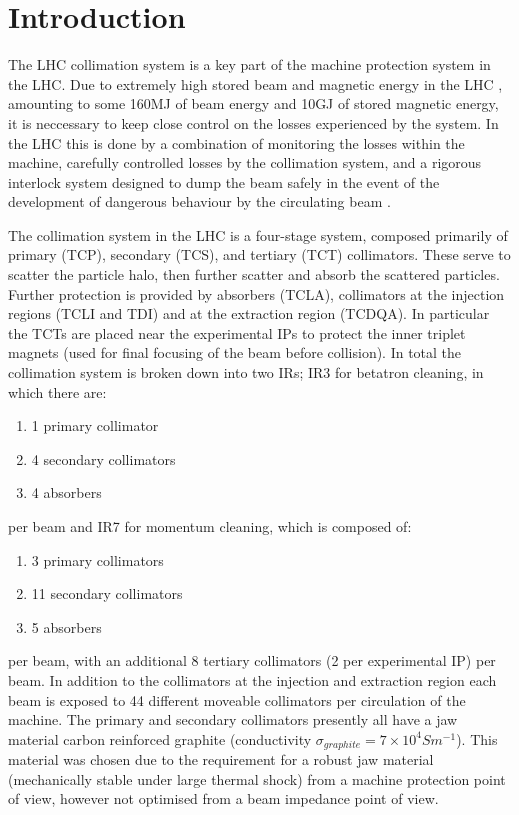 \section{Introduction}

The LHC collimation system is a key part of the machine protection system in the LHC. Due to extremely high stored beam and magnetic energy in the LHC \cite{Schmidt:LHCMP}, amounting to some 160MJ of beam energy and 10GJ of stored magnetic energy, it is neccessary to keep close control on the losses experienced by the system. In the LHC this is done by a combination of monitoring the losses within the machine, carefully controlled losses by the collimation system, and a rigorous interlock system designed to dump the beam safely in the event of the development of dangerous behaviour by the circulating beam \cite{Schmidt:LHCMP}.

The collimation system in the LHC is a four-stage system, composed primarily of primary (TCP), secondary (TCS), and tertiary (TCT) collimators. These serve to scatter the particle halo, then further scatter and absorb the scattered particles. Further protection is provided by absorbers (TCLA), collimators at the injection regions (TCLI and TDI) and at the extraction region (TCDQA). In particular the TCTs are placed near the experimental IPs to protect the inner triplet magnets (used for final focusing of the beam before collision). In total the collimation system is broken down into two IRs; IR3 for betatron cleaning, in which there are:

\begin{enumerate}
\item{1 primary collimator}
\item{4 secondary collimators}
\item{4 absorbers}
\end{enumerate}

per beam and IR7 for momentum cleaning, which is composed of:

\begin{enumerate}
\item{3 primary collimators}
\item{11 secondary collimators}
\item{5 absorbers}
\end{enumerate}

per beam, with an additional 8 tertiary collimators (2 per experimental IP) per beam. In addition to the collimators at the injection and extraction region each beam is exposed to 44 different moveable collimators per circulation of the machine. The primary and secondary collimators presently all have a jaw material carbon reinforced graphite (conductivity $\sigma_{graphite} = 7 \times 10^{4} S m^{-1} $). This material was chosen due to the requirement for a robust jaw material (mechanically stable under large thermal shock) from a machine protection point of view, however not optimised from a beam impedance point of view.

